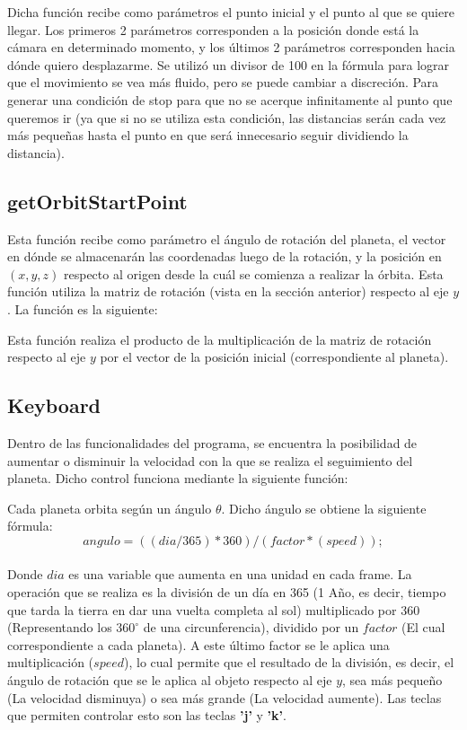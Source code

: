 \documentclass[journal]{IEEEtran}
\begin{document}


Dicha función recibe como parámetros el punto inicial y el punto al que se quiere llegar. Los primeros 2 parámetros corresponden a la posición donde está la cámara en determinado momento, y los últimos 2 parámetros corresponden hacia dónde quiero desplazarme. Se utilizó un divisor de 100 en la fórmula para lograr que el movimiento se vea más fluido, pero se puede cambiar a discreción. Para generar una condición de stop para que no se acerque infinitamente al punto que queremos ir (ya que si no se utiliza esta condición, las distancias serán cada vez más pequeñas hasta el punto en que será innecesario seguir dividiendo la distancia).

\subsection{getOrbitStartPoint}

Esta función recibe como parámetro el ángulo de rotación del planeta, el vector en dónde se almacenarán las coordenadas luego de la rotación, y la posición en $(x,y,z)$ respecto al origen desde la cuál se comienza a realizar la órbita. Esta función utiliza la matriz de rotación (vista en la sección anterior) respecto al eje $y$. La función es la siguiente:



Esta función realiza el producto de la multiplicación de la matriz de rotación respecto al eje $y$ por el vector de la posición inicial (correspondiente al planeta).

\subsection{Keyboard}

Dentro de las funcionalidades del programa, se encuentra la posibilidad de aumentar o disminuir la velocidad con la que se realiza el seguimiento del planeta. Dicho control funciona mediante la siguiente función:



Cada planeta orbita según un ángulo $\theta$. Dicho ángulo se obtiene la siguiente fórmula:\\

\[
	angulo = (( dia / 365)*360)/(factor*(speed));
\]\\

Donde $dia$ es una variable que aumenta en una unidad en cada frame. La operación que se realiza es la división de un día en 365 (1 Año, es decir, tiempo que tarda la tierra en dar una vuelta completa al sol) multiplicado por 360 (Representando los $360^{\circ}$ de una circunferencia), dividido por un $factor$ (El cual correspondiente a cada planeta). A este último factor se le aplica una multiplicación ($speed$), lo cual permite que el resultado de la división, es decir, el ángulo de rotación que se le aplica al objeto respecto al eje $y$, sea más pequeño (La velocidad disminuya) o sea más grande (La velocidad aumente). Las teclas que permiten controlar esto son las teclas \textbf{'j'} y \textbf{'k'}.
\end{document}
